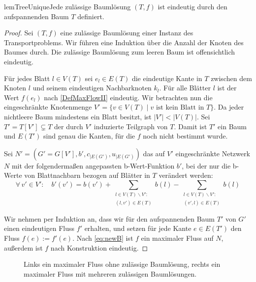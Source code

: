 \vspace{-1.9ex}
\begin{restatable}{lem}{TreeUnique}\label{TreeUnique}Jede zulässige Baumlösung $(T,f)$ ist eindeutig durch den aufspannenden Baum $T$ definiert.\end{restatable}
\begin{proof}Sei $(T,f)$ eine zulässige Baumlösung einer Instanz des Transportproblems. Wir führen eine Induktion über die Anzahl der Knoten des Baumes durch. Die zulässige Baumlösung zum leeren Baum ist offensichtlich eindeutig.

Für jedes Blatt $l\in V(T)$ sei $e_l\in E(T)$ die eindeutige Kante in $T$ zwischen dem Knoten $l$ und seinem eindeutigen Nachbarknoten $k_l$. Für alle Blätter $l$ ist der Wert $f(e_l)$ nach \cref{DefMaxFlowII} eindeutig. Wir betrachten nun die eingeschränkte Knotenmenge $V'=\{v\in V(T)\mid v\text{ ist kein Blatt in }T\}$. Da jeder nichtleere Baum mindestens ein Blatt besitzt, ist $|V'|<|V(T)|$. Sei $T'=T[V']\subsetneq T$ der durch $V'$ induzierte Teilgraph von $T$. Damit ist $T'$ ein Baum und $E(T')$ sind genau die Kanten, für die $f$ noch nicht bestimmt wurde.

Sei $N'=(G'=G[V'],b',c_{|E(G')},u_{|E(G')})$ das auf $V'$ eingeschränkte Netzwerk $N$ mit der folgendermaßen angepassten b-Wert-Funktion $b'$, bei der nur die b-Werte von Blattnachbarn bezogen auf Blätter in $T$ verändert werden:
\begin{equation}\label{eq:newB}
\forall\,v'\in V'\colon\quad b'(v')=b(v')+\sum_{\substack{l\in V(T)\backslash V':\\(l,v')\in E(T)}} b(l)-\sum_{\substack{l\in V(T)\backslash V':\\(v',l)\in E(T)}} b(l)\end{equation}

Wir nehmen per Induktion an, dass wir für den aufspannenden Baum $T'$ von $G'$ einen eindeutigen Fluss $f'$ erhalten, und setzen für jede Kante $e\in E(T')$ den Fluss $f(e):=f'(e)$. Nach \cref{eq:newB} ist $f$ ein maximaler Fluss auf $N$, außerdem ist $f$ nach Konstruktion eindeutig.\end{proof}

\begin{figure}[!ht]\centering
    
    \caption{Links ein maximaler Fluss ohne zulässige Baumlösung, rechts ein maximaler Fluss mit mehreren zulässigen Baumlösungen.}
    \label{fig:BL}
\end{figure}

